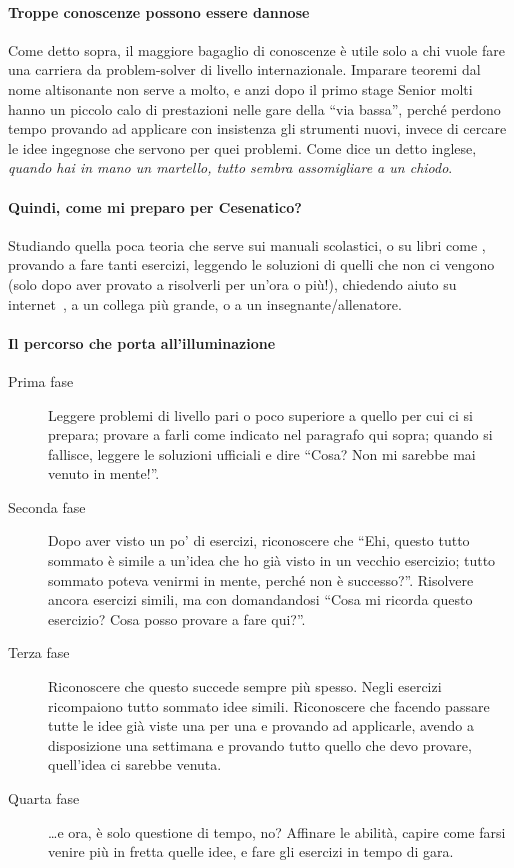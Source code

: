 \documentclass[a4paper,10pt]{paper}
\begin{document}
\paragraph{Troppe conoscenze possono essere dannose}
Come detto sopra, il maggiore bagaglio di conoscenze è utile solo a chi vuole fare una carriera da problem-solver di livello internazionale. Imparare teoremi dal nome altisonante non serve a molto, e anzi dopo il primo stage Senior molti hanno un piccolo calo di prestazioni nelle gare della ``via bassa'', perché perdono tempo provando ad applicare con insistenza gli strumenti nuovi, invece di cercare le idee ingegnose che servono per quei problemi. Come dice un detto inglese, \emph{quando hai in mano un martello, tutto sembra assomigliare a un chiodo}.

\paragraph{Quindi, come mi preparo per Cesenatico?}
Studiando quella poca teoria che serve sui manuali scolastici, o su libri come \cite{culipiccoli,dispenseudine,paolini}, provando a fare tanti esercizi, leggendo le soluzioni di quelli che non ci vengono (solo dopo aver provato a risolverli per un'ora o più!), chiedendo aiuto su internet~\cite{oliforum}, a un collega più grande, o a un insegnante/allenatore.
 
 \paragraph{Il percorso che porta all'illuminazione}
 \begin{description}
  \item[Prima fase] Leggere problemi di livello pari o poco superiore a quello per cui ci si prepara; provare a farli come indicato nel paragrafo qui sopra; quando si fallisce, leggere le soluzioni ufficiali e dire ``Cosa? Non mi sarebbe mai venuto in mente!''.
  \item[Seconda fase] Dopo aver visto un po' di esercizi, riconoscere che ``Ehi, questo tutto sommato è simile a un'idea che ho già visto in un vecchio esercizio; tutto sommato poteva venirmi in mente, perché non è successo?''. Risolvere ancora esercizi simili, ma con domandandosi ``Cosa mi ricorda questo esercizio? Cosa posso provare a fare qui?''.
  \item[Terza fase] Riconoscere che questo succede sempre più spesso. Negli esercizi ricompaiono tutto sommato idee simili. Riconoscere che facendo passare tutte le idee già viste una per una e provando ad applicarle, avendo a disposizione una settimana e provando tutto quello che devo provare, quell'idea ci sarebbe venuta.
  \item[Quarta fase] \dots{}e ora, è solo questione di tempo, no? Affinare le abilità, capire come farsi venire più in fretta quelle idee, e fare gli esercizi in tempo di gara.
 \end{description} 
\end{document}
